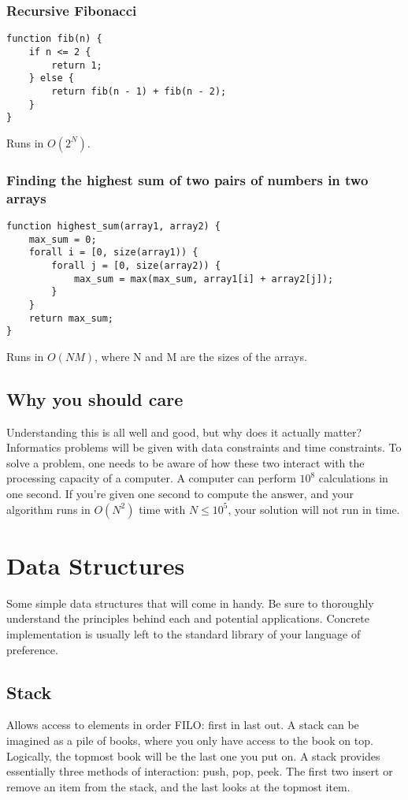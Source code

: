 \documentclass{article}
\begin{document}
\subsubsection{Recursive Fibonacci}
\begin{verbatim}
function fib(n) {
    if n <= 2 {
        return 1;
    } else {
        return fib(n - 1) + fib(n - 2);
    }
}
\end{verbatim}
Runs in \(O(2^N)\).

\subsubsection{Finding the highest sum of two pairs of numbers in two arrays}
\begin{verbatim}
function highest_sum(array1, array2) {
    max_sum = 0;
    forall i = [0, size(array1)) {
        forall j = [0, size(array2)) {
            max_sum = max(max_sum, array1[i] + array2[j]);
        }
    }
    return max_sum;
}
\end{verbatim}
Runs in \(O(NM)\), where N and M are the sizes of the arrays.

\subsection{Why you should care}
Understanding this is all well and good, but why does it actually matter? Informatics problems will be given with data constraints and time constraints. To solve a problem, one needs to be aware of how these two interact with the processing capacity of a computer. A computer can perform \(10^8\) calculations in one second. If you're given one second to compute the answer, and your algorithm runs in \(O(N^2)\) time with \(N \leq 10^5\), your solution will not run in time.

\section{Data Structures}
Some simple data structures that will come in handy. Be sure to thoroughly understand the principles behind each and potential applications. Concrete implementation is usually left to the standard library of your language of preference.

\subsection{Stack}
Allows access to elements in order FILO: first in last out. A stack can be imagined as a pile of books, where you only have access to the book on top. Logically, the topmost book will be the last one you put on. A stack provides essentially three methods of interaction: push, pop, peek. The first two insert or remove an item from the stack, and the last looks at the topmost item. 
\end{document}
